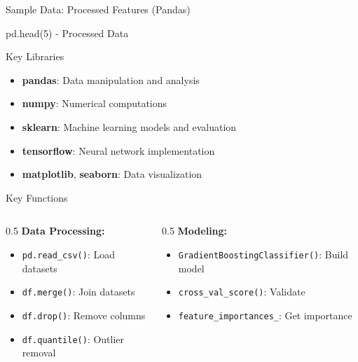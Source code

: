 \documentclass[aspectratio=169]{beamer}
\begin{document}
\begin{frame}{Sample Data: Processed Features (Pandas)}
\bigskip
\bigskip
\begin{block}{pd.head(5) - Processed Data}
\lstset{style=pandas}

\end{block}
\end{frame}

\begin{frame}{Key Libraries}
\begin{itemize}
    \item \textbf{pandas}: Data manipulation and analysis
    \item \textbf{numpy}: Numerical computations
    \item \textbf{sklearn}: Machine learning models and evaluation
    \item \textbf{tensorflow}: Neural network implementation
    \item \textbf{ matplotlib}, \textbf{seaborn}: Data visualization
\end{itemize}
\end{frame}

\begin{frame}{Key Functions}
\begin{columns}
\begin{column}{0.5\textwidth}
\textbf{Data Processing:}
\begin{itemize}
    \item \texttt{pd.read\_csv()}: Load datasets
    \item \texttt{df.merge()}: Join datasets
    \item \texttt{df.drop()}: Remove columns
    \item \texttt{df.quantile()}: Outlier removal
\end{itemize}
\end{column}
\begin{column}{0.5\textwidth}
\textbf{Modeling:}
\begin{itemize}
    \item \texttt{GradientBoostingClassifier()}: Build model
    \item \texttt{cross\_val\_score()}: Validate
    \item \texttt{feature\_importances\_}: Get importance
\end{itemize}
\end{column}
\end{columns}
\end{frame}
\end{document}
